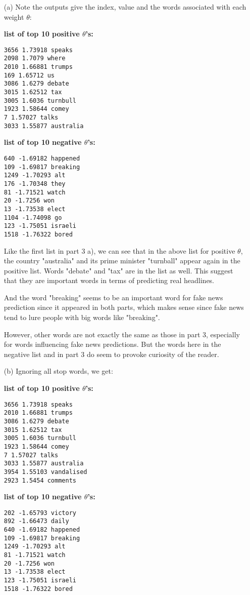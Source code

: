 \documentclass{article}
\begin{document}
\begin{enumerate}


\item[(a)]
Note the outputs give the index, value and the words associated with each weight $\theta$:

\textbf{list of top 10 positive $\theta$'s:}
\begin{verbatim}
3656 1.73918 speaks
2098 1.7079 where
2010 1.66881 trumps
169 1.65712 us
3086 1.6279 debate
3015 1.62512 tax
3005 1.6036 turnbull
1923 1.58644 comey
7 1.57027 talks
3033 1.55877 australia
\end{verbatim}

\textbf{list of top 10 negative $\theta$'s:}
\begin{verbatim}
640 -1.69182 happened
109 -1.69817 breaking
1249 -1.70293 alt
176 -1.70348 they
81 -1.71521 watch
20 -1.7256 won
13 -1.73538 elect
1104 -1.74098 go
123 -1.75051 israeli
1518 -1.76322 bored
\end{verbatim}

Like the first list in part 3 a), we can see that in the above list for positive $\theta$, the country "australia" and its prime minister "turnball" appear again in the positive list. Words "debate" and "tax" are in the list as well. This suggest that they are important words in terms of predicting real headlines.

And the word "breaking" seems to be an important word for fake news prediction since it appeared in both parts, which makes sense since fake news tend to lure people with big words like "breaking".

However, other words are not exactly the same as those in part 3, especially for words influencing fake news predictions. But the words here in the negative list and in part 3 do seem to provoke curiosity of the reader.

\item[(b)]
Ignoring all stop words, we get:

\textbf{list of top 10 positive $\theta$'s:}
\begin{verbatim}
3656 1.73918 speaks
2010 1.66881 trumps
3086 1.6279 debate
3015 1.62512 tax
3005 1.6036 turnbull
1923 1.58644 comey
7 1.57027 talks
3033 1.55877 australia
3954 1.55103 vandalised
2923 1.5454 comments
\end{verbatim}

\textbf{list of top 10 negative $\theta$'s:}
\begin{verbatim}
202 -1.65793 victory
892 -1.66473 daily
640 -1.69182 happened
109 -1.69817 breaking
1249 -1.70293 alt
81 -1.71521 watch
20 -1.7256 won
13 -1.73538 elect
123 -1.75051 israeli
1518 -1.76322 bored
\end{verbatim}


\end{enumerate}
\end{document}
